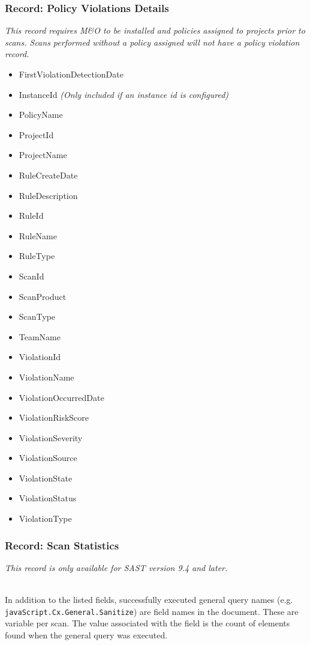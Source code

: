 \subsubsection{Record: Policy Violations Details}
\textit{This record requires M\&O to be installed and policies assigned to projects prior to scans.  Scans performed without a policy assigned will not have a policy
violation record.}

\begin{itemize}
    \item FirstViolationDetectionDate
    \item InstanceId \textit{(Only included if an instance id is configured)}
    \item PolicyName
    \item ProjectId
    \item ProjectName
    \item RuleCreateDate
    \item RuleDescription
    \item RuleId
    \item RuleName
    \item RuleType
    \item ScanId
    \item ScanProduct
    \item ScanType
    \item TeamName
    \item ViolationId
    \item ViolationName
    \item ViolationOccurredDate
    \item ViolationRiskScore
    \item ViolationSeverity
    \item ViolationSource
    \item ViolationState
    \item ViolationStatus
    \item ViolationType
\end{itemize}


\subsubsection{Record: Scan Statistics}
\textit{This record is only available for SAST version 9.4 and later.}

\noindent\\In addition to the listed fields, successfully executed general query names (e.g. \texttt{javaScript.Cx.General.Sanitize}) are field names in the 
document.  These are variable per scan.  The value associated with the field is the count of elements found when the general query was executed.


